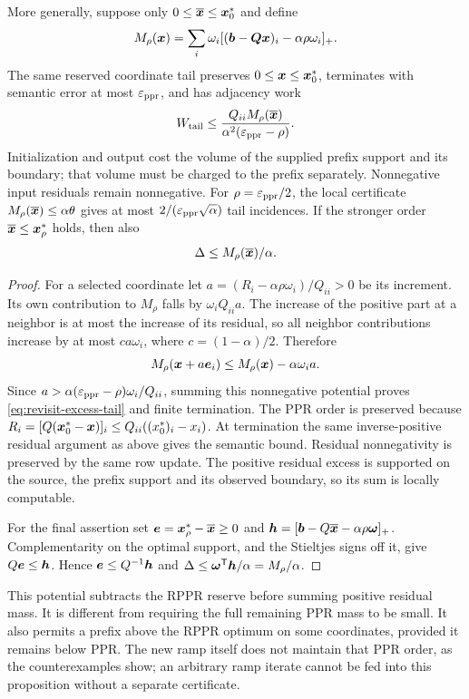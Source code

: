 \begin{proposition}
\label{prop:revisit-excess-tail}
More generally, suppose only $0\leq\overline{\bm{x}}\leq\bm{x}_0^*$ and define
\[
 M_\rho(\bm{x})=\sum_i\omega_i
       [(\bm{b}-\bm{Q}\bm{x})_i-\alpha\rho\omega_i]_+.
\]
The same reserved coordinate tail preserves $0\leq\bm{x}\leq\bm{x}_0^*$,
terminates with semantic error at most $\varepsilon_{\mathrm{ppr}}$, and has adjacency work
\begin{equation}
 W_{\rm tail}\leq
 \frac{Q_{ii}M_\rho(\overline{\bm{x}})}
      {\alpha^2(\varepsilon_{\mathrm{ppr}}-\rho)}.
 \label{eq:revisit-excess-tail}
\end{equation}
Initialization and output cost the volume of the supplied prefix support
and its boundary; that volume must be charged to the prefix separately.
Nonnegative input residuals remain nonnegative.
For $\rho=\varepsilon_{\mathrm{ppr}}/2$, the local certificate
$M_\rho(\overline{\bm{x}})\leq\alpha\theta$ gives at most
$2/(\varepsilon_{\mathrm{ppr}}\sqrt\alpha)$ tail incidences.
If the stronger order $\overline{\bm{x}}\leq\bm{x}_\rho^*$ holds, then also
\[
 \Delta\leq M_\rho(\overline{\bm{x}})/\alpha.
\]
\end{proposition}
\begin{proof}
For a selected coordinate let
$a=(R_i-\alpha\rho\omega_i)/Q_{ii}>0$ be its increment.
Its own contribution to $M_\rho$ falls by $\omega_iQ_{ii}a$.
The increase of the positive part at a neighbor is at most the increase
of its residual, so all neighbor contributions increase by at most
$ca\omega_i$, where $c=(1-\alpha)/2$.
Therefore
\[
 M_\rho(\bm{x}+a\bm{e}_{i})
 \leq M_\rho(\bm{x})-\alpha\omega_i a.
\]
Since $a>\alpha(\varepsilon_{\mathrm{ppr}}-\rho)\omega_i/Q_{ii}$, summing this
nonnegative potential proves \cref{eq:revisit-excess-tail} and finite
termination. The PPR order is preserved because
$R_i=[Q(\bm{x}_0^*-\bm{x})]_i\leq Q_{ii}((x_0^*)_i-x_i)$.
At termination the same inverse-positive residual argument as above gives
the semantic bound. Residual nonnegativity is preserved by the same row
update. The positive residual excess is supported on the source, the
prefix support and its observed boundary, so its sum is locally computable.

For the final assertion set $\bm{e}=\bm{x}_\rho^*-\overline{\bm{x}}\geq0$
and $\bm{h}=[\bm{b}-Q\overline{\bm{x}}-\alpha\rho\bm{\omega}]_+$.
Complementarity on the optimal support, and the Stieltjes signs off it,
give $Q\bm{e}\leq\bm{h}$. Hence
$\bm{e}\leq Q^{-1}\bm{h}$ and
$\Delta\leq\bm{\omega}^{\mathsf{T}}\bm{h}/\alpha=M_\rho/\alpha$.
\end{proof}

This potential subtracts the RPPR reserve before summing positive residual
mass. It is different from requiring the full remaining PPR mass to be
small. It also permits a prefix above the RPPR optimum on some coordinates,
provided it remains below PPR. The new ramp itself does not maintain that
PPR order, as the counterexamples show; an arbitrary ramp iterate cannot
be fed into this proposition without a separate certificate.

